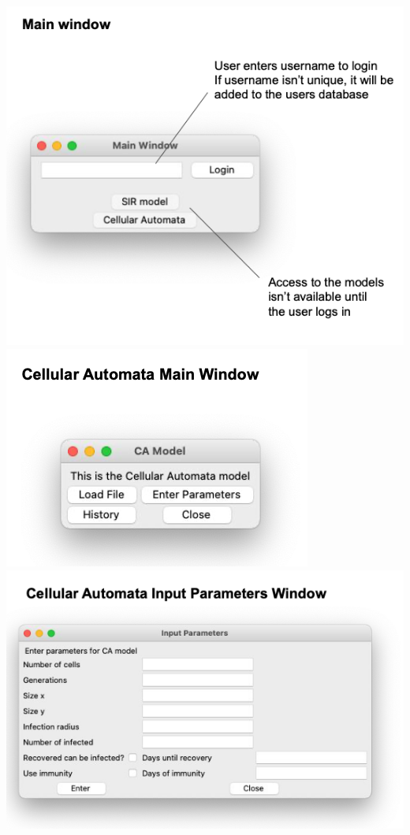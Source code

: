\documentclass[11pt, a4paper]{article}
\begin{document}
\includegraphics[width=\textwidth]{a_main_window.png}
\includegraphics[width=\textwidth]{a_ca_main.png}
\includegraphics[width=\textwidth]{a_ca_input.png}
\end{document}
